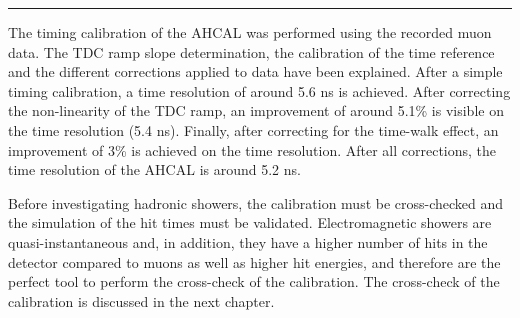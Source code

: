 \begin{center}
	\rule{0.5\textwidth}{.4pt}
\end{center}

The timing calibration of the AHCAL was performed using the recorded muon data. The TDC ramp slope determination, the calibration of the time reference and the different corrections applied to data have been explained. After a simple timing calibration, a time resolution of around 5.6 ns is achieved. After correcting the non-linearity of the TDC ramp, an improvement of around 5.1\% is visible on the time resolution (5.4 ns). Finally, after correcting for the time-walk effect, an improvement of 3\% is achieved on the time resolution. After all corrections, the time resolution of the AHCAL is around 5.2 ns.

Before investigating hadronic showers, the calibration must be cross-checked and the simulation of the hit times must be validated. Electromagnetic showers are quasi-instantaneous and, in addition, they have a higher number of hits in the detector compared to muons as well as higher hit energies, and therefore are the perfect tool to perform the cross-check of the calibration. The cross-check of the calibration is discussed in the next chapter.
